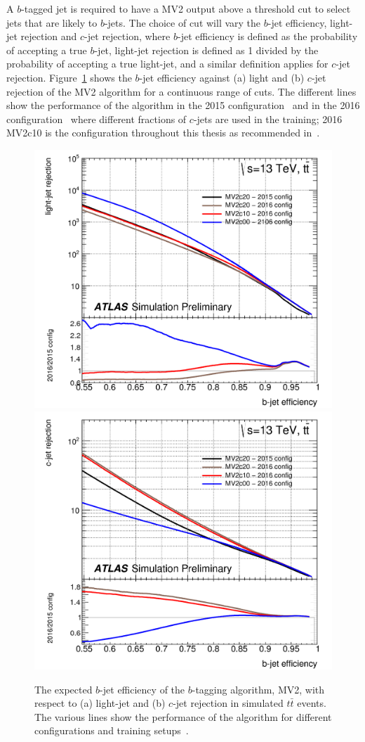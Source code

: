 A $b$-tagged jet is required to have a MV2 output above a threshold cut to select jets that are likely to $b$-jets.
The choice of cut will vary the $b$-jet efficiency, light-jet rejection and $c$-jet rejection,
where $b$-jet efficiency is defined as the probability of accepting a true $b$-jet,
light-jet rejection is defined as 1 divided by the probability of accepting a true light-jet, and a similar definition applies for $c$-jet rejection.
Figure~\ref{fig:obj-bjets_perf} shows the $b$-jet efficiency against (a) light and (b) $c$-jet rejection of the MV2 algorithm for a continuous range of cuts.
The different lines show the performance of the algorithm in the 2015 configuration~\cite{obj-bjets_algo_2015}
and in the 2016 configuration~\cite{obj-bjets_algo_2016} where different fractions of $c$-jets are used in the training;
2016 MV2c10 is the configuration throughout this thesis as recommended in~\cite{obj-bjets_algo_2016}.
    
\begin{figure}[!ht]
  \begin{center}
    \captionsetup[subfigure]{aboveskip=0pt,justification=centering}
     {\includegraphics[width=0.48\linewidth, angle=0]{figs/Objects/bjets_perf_light}}
      { \includegraphics[width=0.48\linewidth, angle=0]{figs/Objects/bjets_perf_charm}}
  \end{center}
  \caption[The expected $b$-jet efficiency of the $b$-tagging algorithm, MV2, with respect to
    light-jet and $c$-jet rejection in simulated $t\bar{t}$ events.]
    {The expected $b$-jet efficiency of the $b$-tagging algorithm, MV2, with respect to
    (a) light-jet and (b) $c$-jet rejection in simulated $t\bar{t}$ events.
    The various lines show the performance of the algorithm for different configurations and training setups~\cite{obj-bjets_algo_2016}.}
  \label{fig:obj-bjets_perf}
\end{figure}

